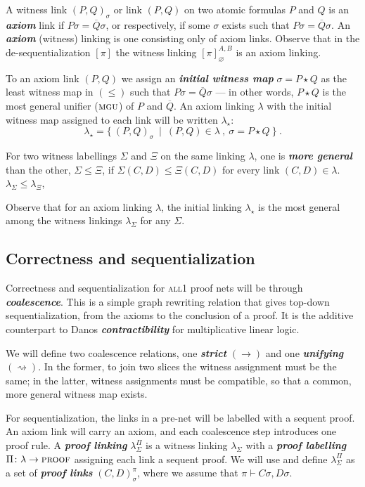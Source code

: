 \documentclass[UKenglish]{lipics-v2016}
\theoremstyle{plain}
\newcommand\defn[1]{\textit{\textbf{#1}}}
\newcommand\proofs{\textsc{proof}}
\newcommand\all{\textsc{all}}
\newcommand\+{+}
\renewcommand\*{\times}
\newcommand\dual[1]{\overline{#1}}
\newcommand\prf[3]{#1\vdash\!#2,#3}
\newcommand\deseq[4][\sigma]{[#2]_{#1}^{#3,#4}}
\newcommand\gen{\leq}
\newcommand\init[2]{#1\star #2}
\newcommand\link[3][\sigma]{(#2,#3)_{#1}}
\newcommand\scoal{\rightarrow} %
\newcommand\ucoal{\rightsquigarrow}
\begin{document}
A witness link $\link PQ$ or link $(P,Q)$ on two atomic formulas $P$ and $Q$ is an \defn{axiom} link if $P\sigma=\dual Q\sigma$, or respectively, if some $\sigma$ exists such that $P\sigma=\dual Q\sigma$. An \defn{axiom} (witness) linking is one consisting only of axiom links. Observe that in the de-sequentialization $[\pi]$ the witness linking $\deseq[\varnothing]\pi AB$ is an axiom linking.

To an axiom link $(P,Q)$ we assign an \defn{initial witness map} $\sigma=\init PQ$ as the least witness map in $(\gen)$ such that $P\sigma=\dual Q\sigma$ --- in other words, $\init PQ$ is the most general unifier ($\textsc{mgu}$) of $P$ and $\dual Q$. An axiom linking $\lambda$ with the initial witness map assigned to each link will be written $\lambda_\star$:
\[
	\lambda_\star = \{~\link PQ~\mid~(P,Q)\in\lambda~,~\sigma=\init PQ~\}~.
\]

For two witness labellings $\Sigma$ and $\Xi$ on the same linking $\lambda$, one is \defn{more general} than the other, $\Sigma\gen\Xi$, if $\Sigma(C,D)\gen\Xi(C,D)$ for every link $(C,D)\in\lambda$.  $\lambda_\Sigma\gen\lambda_\Xi$,

Observe that for an axiom linking $\lambda$, the initial linking $\lambda_\star$ is the most general among the witness linkings $\lambda_\Sigma$ for any $\Sigma$.




\subsection{Correctness and sequentialization}

Correctness and sequentialization for \all1 proof nets will be through \defn{coalescence}. This is a simple graph rewriting relation that gives top-down sequentialization, from the axioms to the conclusion of a proof. It is the additive counterpart to Danos \defn{contractibility} for multiplicative linear logic. 

We will define two coalescence relations, one \defn{strict} $(\scoal)$ and one \defn{unifying} $(\ucoal)$. In the former, to join two slices the witness assignment must be the same; in the latter, witness assignments must be compatible, so that a common, more general witness map exists. 

For sequentialization, the links in a pre-net will be labelled with a sequent proof. An axiom link will carry an axiom, and each coalescence step introduces one proof rule. A \defn{proof linking} $\lambda_\Sigma^\Pi$ is a witness linking $\lambda_\Sigma$ with a \defn{proof labelling} $\Pi\colon \lambda\to\proofs$ assigning each link a sequent proof. We will use and define $\lambda_\Sigma^\Pi$ as a set of \defn{proof links} $\link CD^\pi$, where we assume that $\prf\pi{C\sigma}{D\sigma}$.
\end{document}
